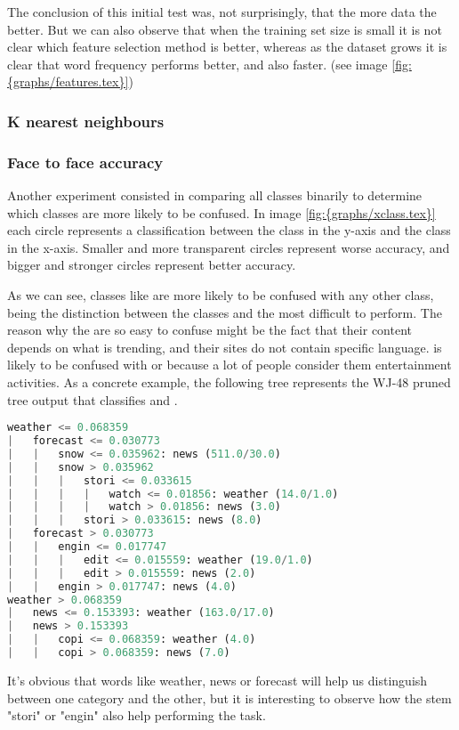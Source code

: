  
The conclusion of this initial test was, not surprisingly, that the more data the better. But we can also observe that when the training set size is small it is not clear which feature selection 
method is better, whereas as the dataset grows it is clear that word frequency performs better, and also faster. (see image \ref{fig:{graphs/features.tex}})

\subsubsection{K nearest neighbours}

\subsubsection{Face to face accuracy}
Another experiment consisted in comparing all classes binarily to determine which classes are more likely to be confused. In image \ref{fig:{graphs/xclass.tex}} each circle represents a classification 
between the class in the y-axis and the class in the x-axis. Smaller and more transparent circles represent worse accuracy, and bigger and stronger circles represent better accuracy. 

As we can see, classes like  are more likely to be confused with any other class, being the distinction between the classes  and  the most
difficult to perform. The reason why the  are so easy to confuse might be the fact that their content depends on what is trending, and their sites do not contain specific language.
 is likely to be confused with  or  because a lot of people consider them entertainment activities. 
As a concrete example, the following tree represents the WJ-48 pruned tree output that classifies  and .

\begin{lstlisting}[language=Python]
weather <= 0.068359
|   forecast <= 0.030773
|   |   snow <= 0.035962: news (511.0/30.0)
|   |   snow > 0.035962
|   |   |   stori <= 0.033615
|   |   |   |   watch <= 0.01856: weather (14.0/1.0)
|   |   |   |   watch > 0.01856: news (3.0)
|   |   |   stori > 0.033615: news (8.0)
|   forecast > 0.030773
|   |   engin <= 0.017747
|   |   |   edit <= 0.015559: weather (19.0/1.0)
|   |   |   edit > 0.015559: news (2.0)
|   |   engin > 0.017747: news (4.0)
weather > 0.068359
|   news <= 0.153393: weather (163.0/17.0)
|   news > 0.153393
|   |   copi <= 0.068359: weather (4.0)
|   |   copi > 0.068359: news (7.0)
\end{lstlisting}
It's obvious that words like weather, news or forecast will help us distinguish between one category and the other, but it is interesting to observe how the stem "stori" or "engin" also help performing
the task.


